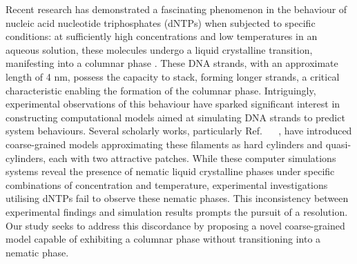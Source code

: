 \documentclass[aip,jcp, amsmath, amssymb, reprint]{revtex4-1}
\begin{document}
Recent research has demonstrated a fascinating phenomenon in the behaviour of nucleic acid nucleotide triphosphates (dNTPs) when subjected to specific conditions: at sufficiently high concentrations and low temperatures in an aqueous solution, these molecules undergo a liquid crystalline transition, manifesting into a columnar phase \cite{Smith}. These DNA strands, with an approximate length of 4 nm, possess the capacity to stack, forming longer strands, a critical characteristic enabling the formation of the columnar phase. Intriguingly, experimental observations of this behaviour have sparked significant interest in constructing computational models aimed at simulating DNA strands to predict system behaviours. Several scholarly works, particularly Ref.  \cite{Nguyen} \ \cite{C0JM02355H} \ \cite{Bellini}, have introduced coarse-grained models approximating these filaments as hard cylinders and quasi-cylinders, each with two attractive patches. While these computer simulations systems reveal the presence of nematic liquid crystalline phases under specific combinations of concentration and temperature, experimental investigations utilising dNTPs fail to observe these nematic phases. This inconsistency between experimental findings and simulation results prompts the pursuit of a resolution. Our study seeks to address this discordance by proposing a novel coarse-grained model capable of exhibiting a columnar phase without transitioning into a nematic phase.
\end{document}

